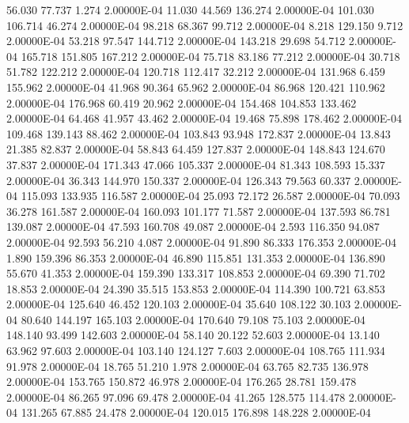     56.030    77.737     1.274  2.00000E-04
    11.030    44.569   136.274  2.00000E-04
   101.030   106.714    46.274  2.00000E-04
    98.218    68.367    99.712  2.00000E-04
     8.218   129.150     9.712  2.00000E-04
    53.218    97.547   144.712  2.00000E-04
   143.218    29.698    54.712  2.00000E-04
   165.718   151.805   167.212  2.00000E-04
    75.718    83.186    77.212  2.00000E-04
    30.718    51.782   122.212  2.00000E-04
   120.718   112.417    32.212  2.00000E-04
   131.968     6.459   155.962  2.00000E-04
    41.968    90.364    65.962  2.00000E-04
    86.968   120.421   110.962  2.00000E-04
   176.968    60.419    20.962  2.00000E-04
   154.468   104.853   133.462  2.00000E-04
    64.468    41.957    43.462  2.00000E-04
    19.468    75.898   178.462  2.00000E-04
   109.468   139.143    88.462  2.00000E-04
   103.843    93.948   172.837  2.00000E-04
    13.843    21.385    82.837  2.00000E-04
    58.843    64.459   127.837  2.00000E-04
   148.843   124.670    37.837  2.00000E-04
   171.343    47.066   105.337  2.00000E-04
    81.343   108.593    15.337  2.00000E-04
    36.343   144.970   150.337  2.00000E-04
   126.343    79.563    60.337  2.00000E-04
   115.093   133.935   116.587  2.00000E-04
    25.093    72.172    26.587  2.00000E-04
    70.093    36.278   161.587  2.00000E-04
   160.093   101.177    71.587  2.00000E-04
   137.593    86.781   139.087  2.00000E-04
    47.593   160.708    49.087  2.00000E-04
     2.593   116.350    94.087  2.00000E-04
    92.593    56.210     4.087  2.00000E-04
    91.890    86.333   176.353  2.00000E-04
     1.890   159.396    86.353  2.00000E-04
    46.890   115.851   131.353  2.00000E-04
   136.890    55.670    41.353  2.00000E-04
   159.390   133.317   108.853  2.00000E-04
    69.390    71.702    18.853  2.00000E-04
    24.390    35.515   153.853  2.00000E-04
   114.390   100.721    63.853  2.00000E-04
   125.640    46.452   120.103  2.00000E-04
    35.640   108.122    30.103  2.00000E-04
    80.640   144.197   165.103  2.00000E-04
   170.640    79.108    75.103  2.00000E-04
   148.140    93.499   142.603  2.00000E-04
    58.140    20.122    52.603  2.00000E-04
    13.140    63.962    97.603  2.00000E-04
   103.140   124.127     7.603  2.00000E-04
   108.765   111.934    91.978  2.00000E-04
    18.765    51.210     1.978  2.00000E-04
    63.765    82.735   136.978  2.00000E-04
   153.765   150.872    46.978  2.00000E-04
   176.265    28.781   159.478  2.00000E-04
    86.265    97.096    69.478  2.00000E-04
    41.265   128.575   114.478  2.00000E-04
   131.265    67.885    24.478  2.00000E-04
   120.015   176.898   148.228  2.00000E-04
